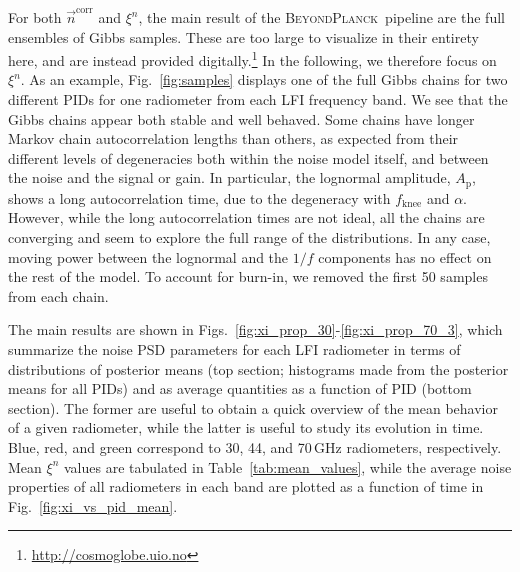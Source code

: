 \documentclass{aa}
\newcommand{\n}[0]{\vec{n}}
\newcommand{\BP}{\textsc{BeyondPlanck}}
\begin{document}
For both $\n^{\mathrm{corr}}$ and $\xi^n$, the main result of the
\BP\ pipeline are the full ensembles of Gibbs samples. These are
too large to visualize in their entirety here, and 
are instead provided digitally.\footnote{\url{http://cosmoglobe.uio.no}} In the
following, we therefore focus on $\xi^n$. As an example,
Fig.~\ref{fig:samples} displays one of the full Gibbs chains for two
different PIDs for one radiometer from each LFI frequency band. We see
that the Gibbs chains appear both stable and well behaved. Some chains
have longer Markov chain autocorrelation lengths than others, as
expected from their different levels of degeneracies both within the
noise model itself, and between the noise and the signal or
gain. In particular, the lognormal amplitude, $A_\mathrm{p}$, shows a 
long autocorrelation time, due to the degeneracy with $f_{\mathrm{knee}}$ 
and $\alpha$. However, while the long autocorrelation times are not ideal, 
all the chains are converging and seem to explore the full range of the 
distributions. In any case, moving power between the lognormal and the 
$1/f$ components has no
effect on the rest of the model. To account for burn-in, we removed the first 50 samples from each
chain.

The main results are shown in
Figs.~\ref{fig:xi_prop_30}-\ref{fig:xi_prop_70_3}, which summarize
the noise PSD parameters for each LFI radiometer in terms of
distributions of posterior means (top section; histograms made from
the posterior means for all PIDs) and as average quantities as a function 
of PID (bottom section). The former are useful to obtain a quick overview of
the mean behavior of a given radiometer, while the latter is useful
to study its evolution in time. Blue, red, and green correspond
to 30, 44, and 70\,GHz radiometers, respectively. Mean $\xi^n$ values
are tabulated in Table~\ref{tab:mean_values}, while the average noise
properties of all radiometers in each band are plotted as a function
of time in Fig.~\ref{fig:xi_vs_pid_mean}.
\end{document}
